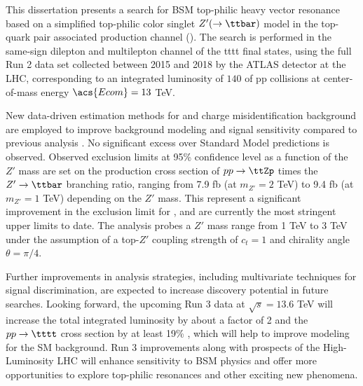 \documentclass[../thesis.tex]{subfiles}
\begin{document}
\vspace{-1\baselineskip}

This dissertation presents a search for \acs{BSM} top-philic heavy vector resonance based on a simplified top-philic color singlet $Z'(\rightarrow\ttbar)$ model in the top-quark pair associated production channel (\ttZp). The search is performed in the same-sign dilepton and multilepton channel of the \acs{tttt} final states, using the full Run 2 data set collected between 2015 and 2018 by the \acs{ATLAS} detector at the \acs{LHC}, corresponding to an integrated luminosity of $140$ \fb of \acs{pp} collisions at center-of-mass energy $\acs{Ecom}=13$ TeV.

New data-driven estimation methods for \ttW and charge misidentification background are employed to improve background modeling and signal sensitivity compared to previous analysis \citep{theory:ttZp_1los}. No significant excess over Standard Model predictions is observed. Observed exclusion limits at 95\% confidence level as a function of the $Z'$ mass are set on the production cross section of $pp\rightarrow\ttZp$ times the $Z'\rightarrow\ttbar$ branching ratio, ranging from 7.9 fb (at $m_{Z'}=2$ TeV) to 9.4 fb (at $m_{Z'}=1$ TeV) depending on the $Z'$ mass. This represent a significant improvement in the exclusion limit for \ttZp \citep{theory:ttZp_1los}, and are currently the most stringent upper limits to date. The analysis probes a $Z'$ mass range from 1 TeV to 3 TeV under the assumption of a top-$Z'$ coupling strength of $c_t=1$ and chirality angle $\theta=\pi/4$.

Further improvements in analysis strategies, including multivariate techniques for signal discrimination, are expected to increase discovery potential in future searches. Looking forward, the upcoming Run 3 data at $\sqrt{s} = 13.6$ TeV will increase the total integrated luminosity by about a factor of 2 \citep{ATL-DAPR-PUB-2023-001} and the $pp\rightarrow\tttt$ cross section by at least 19\% \citep{PhysRevLett.131.211901}, which will help to improve modeling for the \acs{SM} \tttt background. Run 3 improvements along with prospects of the High-Luminosity \acs{LHC} will enhance sensitivity to \acs{BSM} physics and offer more opportunities to explore top-philic resonances and other exciting new phenomena. 
\end{document}
